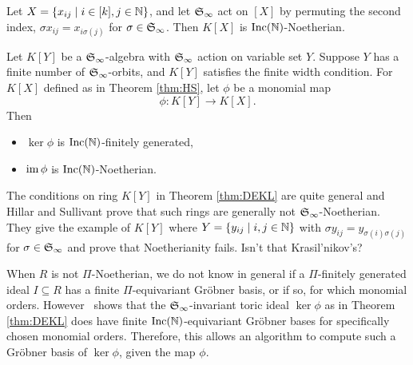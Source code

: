 \begin{theorem}\label{thm:HS}
 Let $X = \{x_{ij} \mid i \in [k], j \in \mathbb N\}$, and let $\mathfrak S_\infty$ act on $[X]$ by permuting the second index, $\sigma x_{ij} = x_{i\sigma(j)}$ for $\sigma \in \mathfrak S_\infty$.  Then $K[X]$ is $\operatorname{Inc}(\mathbb N)$-Noetherian.
\end{theorem}

\begin{theorem}\label{thm:DEKL}
 Let $K[Y]$ be a $\mathfrak S_\infty$-algebra with $\mathfrak S_\infty$ action on variable set $Y$.  Suppose $Y$ has a finite number of $\mathfrak S_\infty$-orbits, and $K[Y]$ satisfies the finite width condition.  For $K[X]$ defined as in Theorem \ref{thm:HS}, let $\phi$ be a monomial map
  \[ \phi: K[Y] \to K[X]. \]
 Then
 \begin{itemize}
  \item $\ker \phi$ is $\operatorname{Inc}(\mathbb N)$-finitely generated,
  \item $\operatorname{im} \phi$ is $\operatorname{Inc}(\mathbb N)$-Noetherian.
 \end{itemize}
\end{theorem}

The conditions on ring $K[Y]$ in Theorem \ref{thm:DEKL} are quite general and Hillar and Sullivant \cite{hillar2012finite} prove that such rings are generally not $\mathfrak S_\infty$-Noetherian.  They give the example of $K[Y]$ where $Y = \{y_{ij} \mid i, j \in \mathbb N\}$ with $\sigma y_{ij} = y_{\sigma(i)\sigma(j)}$ for $\sigma \in \mathfrak S_\infty$ and prove that Noetherianity fails. {\color{red} Isn't that Krasil'nikov's?}

When $R$ is not $\Pi$-Noetherian, we do not know in general if a $\Pi$-finitely generated ideal $I\subseteq R$ has a finite $\Pi$-equivariant Gr\"obner basis, or if so, for which monomial orders.  However~\cite{Krone:egb-toric} shows that the $\mathfrak S_\infty$-invariant toric ideal $\ker \phi$ as in Theorem \ref{thm:DEKL} does have finite $\operatorname{Inc}(\mathbb N)$-equivariant Gr\"obner bases for specifically chosen monomial orders.  Therefore, this allows an algorithm to compute such a Gr\"obner basis of $\ker \phi$, given the map $\phi$.
